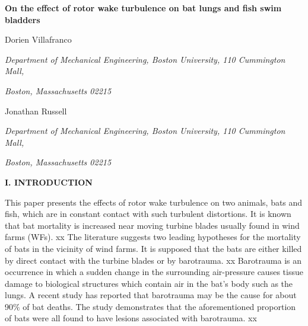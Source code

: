 \documentclass{article}
\begin{document}
\noindent\LARGE{\textbf{On the effect of rotor wake turbulence on bat lungs and fish swim bladders}}
\vspace{0.08cm}
\normalsize

\hspace{0.5cm}Dorien Villafranco

\small\hspace{0.5cm}\textit{Department of Mechanical Engineering, Boston University, 110 Cummington Mall,}

\hspace{0.5cm}\textit{Boston, Massachusetts 02215}
\normalsize
\vspace{0.15cm}

\hspace{0.5cm}Jonathan Russell
\small

\hspace{0.5cm}\textit{Department of Mechanical Engineering, Boston University, 110 Cummington Mall,}

\hspace{0.5cm}\textit{Boston, Massachusetts 02215}


\vspace{5cm}
\begin{multicols}{2}
\noindent\textbf{I. INTRODUCTION}

This paper presents the effects of rotor wake turbulence on two animals, bats and fish, which are in constant contact with such turbulent distortions. It is known that bat mortality is increased near moving turbine blades usually found in wind farms (WFs). xx  The literature suggests two leading hypotheses for the mortality of bats in the vicinity of wind farms. It is supposed that the bats are either killed by direct contact with the turbine blades or by barotrauma. xx Barotrauma is an occurrence in which a sudden change in the surrounding air-pressure causes tissue damage to biological structures which contain air in the bat's body such as the lungs. A recent study has reported that barotrauma may be the cause for about 90$\%$ of bat deaths. The study demonstrates that the aforementioned proportion of bats were all found to have lesions associated with barotrauma. xx
\lipsum[1-2]

\end{multicols}
\end{document}
